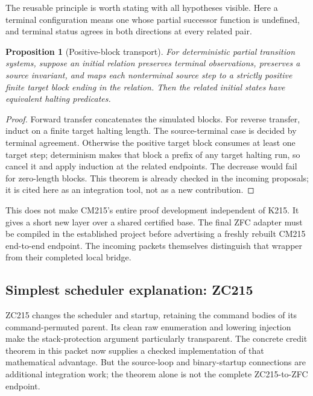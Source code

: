 \documentclass[11pt]{article}
\newtheorem{proposition}[theorem]{Proposition}
\theoremstyle{definition}\newtheorem{definition}[theorem]{Definition}
\begin{document}
The reusable principle is worth stating with all hypotheses visible.
Here a terminal configuration means one whose partial successor function is
undefined, and terminal status agrees in both directions at every related pair.

\begin{proposition}[Positive-block transport]
For deterministic partial transition systems, suppose an initial relation
preserves terminal observations, preserves a source invariant, and maps each
nonterminal source step to a strictly positive finite target block ending in
the relation. Then the related initial states have equivalent halting
predicates.
\end{proposition}

\begin{proof}
Forward transfer concatenates the simulated blocks. For reverse transfer,
induct on a finite target halting length. The source-terminal case is decided
by terminal agreement. Otherwise the positive target block consumes at least
one target step; determinism makes that block a prefix of any target halting
run, so cancel it and apply induction at the related endpoints. The decrease
would fail for zero-length blocks. This theorem is already checked in the
incoming proposals; it is cited here as an integration tool, not as a new
contribution.
\end{proof}

This does not make CM215's entire proof development independent of K215.
It gives a short new layer over a shared certified base. The final ZFC adapter
must be compiled in the established project before advertising a freshly
rebuilt CM215 end-to-end endpoint. The incoming packets themselves distinguish
that wrapper from their completed local bridge.

\subsection{Simplest scheduler explanation: ZC215}

ZC215 changes the scheduler and startup, retaining the command bodies of its
command-permuted parent. Its clean raw enumeration and lowering injection
make the stack-protection argument particularly transparent. The concrete
credit theorem in this packet now supplies a checked implementation of that
mathematical advantage. But the source-loop and binary-startup connections
are additional integration work; the theorem alone is not the complete
ZC215-to-ZFC endpoint.
\end{document}
